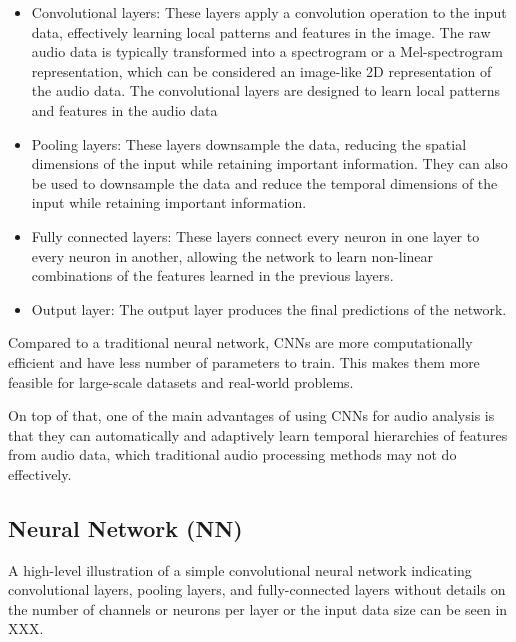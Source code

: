\begin{itemize}

\item Convolutional layers: These layers apply a convolution operation to the input data, effectively learning local patterns and features in the image. The raw audio data is typically transformed into a spectrogram or a Mel-spectrogram representation, which can be considered an image-like 2D representation of the audio data. The convolutional layers are designed to learn local patterns and features in the audio data
\vspace*{3mm}

\item Pooling layers: These layers downsample the data, reducing the spatial dimensions of the input while retaining important information. They can also be used to downsample the data and reduce the temporal dimensions of the input while retaining important information. 
\vspace*{3mm}

\item Fully connected layers: These layers connect every neuron in one layer to every neuron in another, allowing the network to learn non-linear combinations of the features learned in the previous layers.
\vspace*{3mm}

\item Output layer: The output layer produces the final predictions of the network.
\end{itemize}

Compared to a traditional neural network, CNNs are more computationally efficient and have less number of parameters to train. This makes them more feasible for large-scale datasets and real-world problems.

On top of that, one of the main advantages of using CNNs for audio analysis is that they can automatically and adaptively learn temporal hierarchies of features from audio data, which traditional audio processing methods may not do effectively. 

\subsection{Neural Network (NN)}






A high-level illustration of a simple convolutional neural network indicating convolutional layers, pooling layers, and fully-connected layers without details on the number of channels or neurons per layer or the input data size can be seen in XXX.








\newpage


